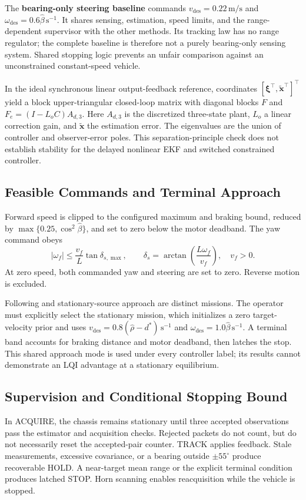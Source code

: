 The \textbf{bearing-only steering baseline} commands $v_{\mathrm{des}}=0.22\,\mathrm{m/s}$ and $\omega_{\mathrm{des}}=0.6\hat\beta\,\mathrm{s^{-1}}$. It shares sensing, estimation, speed limits, and the range-dependent supervisor with the other methods. Its tracking law has no range regulator; the complete baseline is therefore not a purely bearing-only sensing system. Shared stopping logic prevents an unfair comparison against an unconstrained constant-speed vehicle.

In the ideal synchronous linear output-feedback reference, coordinates $[\boldsymbol\xi^\top,\tilde{\mathbf x}^\top]^\top$ yield a block upper-triangular closed-loop matrix with diagonal blocks $F$ and $F_e=(I-L_oC)A_{d,3}$. Here $A_{d,3}$ is the discretized three-state plant, $L_o$ a linear correction gain, and $\tilde{\mathbf x}$ the estimation error. The eigenvalues are the union of controller and observer-error poles. This separation-principle check does not establish stability for the delayed nonlinear EKF and switched constrained controller.

\subsection{Feasible Commands and Terminal Approach}
Forward speed is clipped to the configured maximum and braking bound, reduced by $\max\{0.25,\cos^2\hat\beta\}$, and set to zero below the motor deadband. The yaw command obeys
\begin{equation}
|\omega_f|\le\frac{v_f}{L}\tan\delta_{s,\max},\qquad
\delta_s=\arctan\!\left(\frac{L\omega_f}{v_f}\right),\quad v_f>0.
\end{equation}
At zero speed, both commanded yaw and steering are set to zero. Reverse motion is excluded.

Following and stationary-source approach are distinct missions. The operator must explicitly select the stationary mission, which initializes a zero target-velocity prior and uses $v_{\mathrm{des}}=0.8(\hat\rho-d^\ast)\,\mathrm{s^{-1}}$ and $\omega_{\mathrm{des}}=1.0\hat\beta\,\mathrm{s^{-1}}$. A terminal band accounts for braking distance and motor deadband, then latches the stop. This shared approach mode is used under every controller label; its results cannot demonstrate an LQI advantage at a stationary equilibrium.

\subsection{Supervision and Conditional Stopping Bound}
In ACQUIRE, the chassis remains stationary until three accepted observations pass the estimator and acquisition checks. Rejected packets do not count, but do not necessarily reset the accepted-pair counter. TRACK applies feedback. Stale measurements, excessive covariance, or a bearing outside $\pm55^\circ$ produce recoverable HOLD. A near-target mean range or the explicit terminal condition produces latched STOP. Horn scanning enables reacquisition while the vehicle is stopped.

